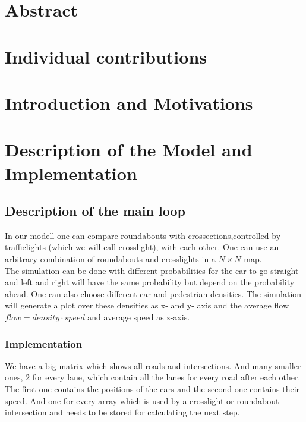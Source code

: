 \documentclass[11pt]{article}
\begin{document}

\tableofcontents

\newpage




\section{Abstract}

\section{Individual contributions}

\section{Introduction and Motivations}

\section{Description of the Model and Implementation}

\subsection{Description of the main loop}

In our modell one can compare roundabouts with crossections,controlled by trafficlights (which we will call crosslight), with each other. One can use an arbitrary combination of roundabouts and crosslights in a $N \times N$ map. \\
The simulation can be done with different probabilities for the car to go straight and left and right will have the same probability but depend on the probability ahead. One can also choose different car and pedestrian densities. 
The simulation will generate a plot over these densities as x- and y- axis and the average flow $flow = density \cdot speed$ and average speed as z-axis. 

\subsubsection{Implementation}

We have a big matrix which shows all roads and intersections. And many smaller ones, 2 for every lane, which contain all the lanes for every road after each other. 
The first one contains the positions of the cars and the second one contains their speed. And one for every array which is used by a crosslight or roundabout intersection and needs to be stored for calculating the next step.\\
\end{document}
